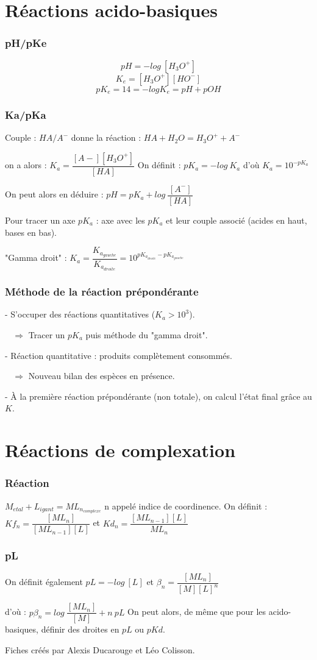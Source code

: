 \documentclass[9pt,twocolumn]{article}
\begin{document}
\setlength{\columnseprule}{0.1pt}
\part*{Réactions acido-basiques}
\section{pH/pKe}
$$\boxed{pH=-log\>[H_3O^+]}$$
$$K_e=[H_3O^+][HO^-]$$
$$pK_e=14=-logK_e=pH+pOH$$


\section{Ka/pKa}

Couple : $HA/A^-$   donne la réaction : $HA+H_2O = H_3O^+ + A^-$

 on a alors : $K_a=\dfrac{[A-][H_3O^+]}{[HA]}$
 \medbreak 
 On définit : $pK_a=-log\>K_a$ d'où $K_a=10^{-pK_a}$
 
 \medbreak
 On peut alors en déduire : $\boxed{pH=pK_a+log\>\dfrac{[A^-]}{[HA]}}$
 
 \medbreak
 
 Pour tracer un axe $pK_a$ : axe avec les $pK_a$ et leur couple associé (acides en haut, bases en bas).
 
 "Gamma droit" : $K_a=\dfrac{K_{a_{gauche}}}{K_{a_{droite}}}=10^{pK_{a_{droite}}-pK_{a_{gauche}}}$
\section{Méthode de la réaction prépondérante}

- S'occuper des réactions quantitatives ($K_a>10^3$).

$\>\>\>\>\Rightarrow$ Tracer un $pK_a$ puis méthode du "gamma droit".

- Réaction quantitative : produits complètement consommés.

$\>\>\>\>\Rightarrow$ Nouveau bilan des espèces en présence.

- À la première réaction prépondérante (non totale), on calcul l'état final grâce au $K$.



\part*{Réactions de complexation}
\section{Réaction}
$M_{etal}+L_{igant} = ML_{n_{complexe}}$  n appelé indice de coordinence.
\medbreak
On définit : $Kf_n=\dfrac{[ML_n]}{[ML_{n-1}][L]}$ et $Kd_n=\dfrac{[ML_{n-1}][L]}{ML_n}$


\section{pL}
On définit également $pL=-log\>[L]$ et $\beta_n=\dfrac{[ML_n]}{[M][L]^n}$

d'où : $\boxed{p\beta_n=log\>\dfrac{[ML_n]}{[M]}+n\>pL}$
\bigbreak
On peut alors, de même que pour les acido-basiques, définir des droites en $pL$ ou $pKd$.

\vfill
\footnotesize{Fiches créés par Alexis Ducarouge et Léo Colisson.}
\end{document}
